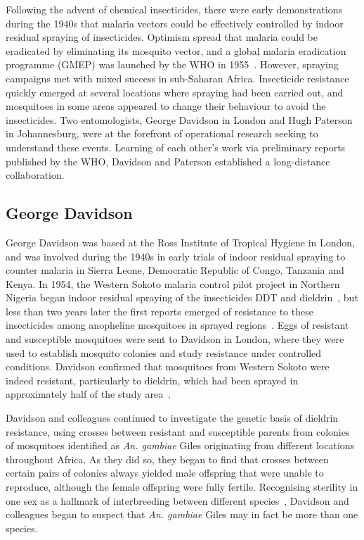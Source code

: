 \documentclass[a4paper,11pt,abstracton,hidelinks]{scrartcl}
\begin{document}
Following the advent of chemical insecticides, there were early demonstrations during the 1940s that malaria vectors could be effectively controlled by indoor residual spraying of insecticides.
%
Optimism spread that malaria could be eradicated by eliminating its mosquito vector, and a global malaria eradication programme (GMEP) was launched by the WHO in 1955~\parencite{Najera2011}.
%
However, spraying campaigns met with mixed success in sub-Saharan Africa.
%
Insecticide resistance quickly emerged at several locations where spraying had been carried out, and mosquitoes in some areas appeared to change their behaviour to avoid the insecticides.
%
Two entomologists, George Davidson in London and Hugh Paterson in Johannesburg, were at the forefront of operational research seeking to understand these events.
%
Learning of each other's work via preliminary reports published by the WHO, Davidson and Paterson established a long-distance collaboration.


\subsection{George Davidson}\label{subsec:george-davidson}

George Davidson was based at the Ross Institute of Tropical Hygiene in London, and was involved during the 1940s in early trials of indoor residual spraying to counter malaria in Sierra Leone, Democratic Republic of Congo, Tanzania and Kenya.
%
In 1954, the Western Sokoto malaria control pilot project in Northern Nigeria began indoor residual spraying of the insecticides DDT and dieldrin~\parencite{BruceChwatt1959}, but less than two years later the first reports emerged of resistance to these insecticides among anopheline mosquitoes in sprayed regions~\parencite{Elliott1956}.
%
Eggs of resistant and susceptible mosquitoes were sent to Davidson in London, where they were used to establish mosquito colonies and study resistance under controlled conditions.
%
Davidson confirmed that mosquitoes from Western Sokoto were indeed resistant, particularly to dieldrin, which had been sprayed in approximately half of the study area~\parencite{Davidson1956}.

Davidson and colleagues continued to investigate the genetic basis of dieldrin resistance, using crosses between resistant and susceptible parents from colonies of mosquitoes identified as \textit{An. gambiae} Giles originating from different locations throughout Africa.
%
As they did so, they began to find that crosses between certain pairs of colonies always yielded male offspring that were unable to reproduce, although the female offspring were fully fertile.
%
Recognising sterility in one sex as a hallmark of interbreeding between different species~\parencite{Haldane1922}, Davidson and colleagues began to suspect that \textit{An. gambiae} Giles may in fact be more than one species.
\end{document}
